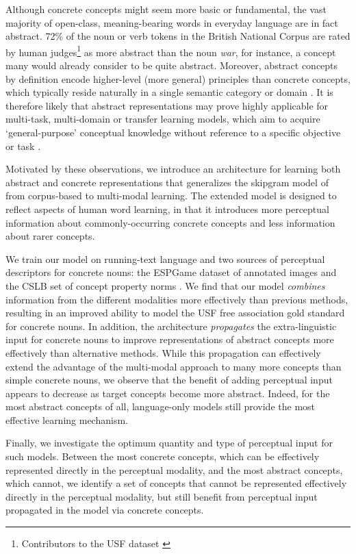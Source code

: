 Although concrete concepts might seem more basic or fundamental, the vast majority of open-class, meaning-bearing words in everyday language are in fact abstract. 72\% of the noun or verb tokens in the British National Corpus \cite{leech1994claws4} are rated by human judges\footnote{Contributors to the USF dataset \cite{nelson2004university}} as more abstract than the noun \emph{war}, for instance, a concept many would already consider to be quite abstract. Moreover, abstract concepts by definition encode higher-level (more general) principles than concrete concepts, which typically reside naturally in a single semantic category or domain \cite{crutch2005abstract}. It is therefore likely that abstract representations may prove highly applicable for multi-task, multi-domain or transfer learning models, which aim to acquire `general-purpose' conceptual knowledge without reference to a specific objective or task \cite{collobert2008unified,mesnil2012unsupervised}. 

Motivated by these observations, we introduce an architecture for learning both abstract and concrete representations that generalizes the skipgram model of \cite{mikolov2013efficient} from corpus-based  to multi-modal learning. The extended model is designed to reflect aspects of human word learning, in that it introduces more perceptual information about commonly-occurring concrete concepts and less information about rarer concepts. 

We train our model on running-text language and two sources of perceptual descriptors for concrete nouns: the ESPGame dataset of annotated images \cite{von2004labeling} and the CSLB set of concept property norms \cite{devereux2013centre}. We find that our model \emph{combines} information from the different modalities more effectively than previous methods, resulting in an improved ability to model the USF free association gold standard \cite{nelson2004university} for concrete nouns. In addition, the architecture  \emph{propagates} the extra-linguistic input for concrete nouns to improve representations of abstract concepts more effectively than alternative methods. While this propagation can effectively extend the advantage of the multi-modal approach to many more concepts than simple concrete nouns, we observe that the benefit of adding perceptual input appears to decrease as target concepts become more abstract. Indeed, for the most abstract concepts of all, language-only models still provide the most effective learning mechanism.  

Finally, we investigate the optimum quantity and type of perceptual input for such models. Between the most concrete concepts, which can be effectively represented directly in the perceptual modality, and the most abstract concepts, which cannot, we identify a set of concepts that cannot be represented effectively directly in the perceptual modality, but still benefit from perceptual input propagated in the model via concrete concepts. 

